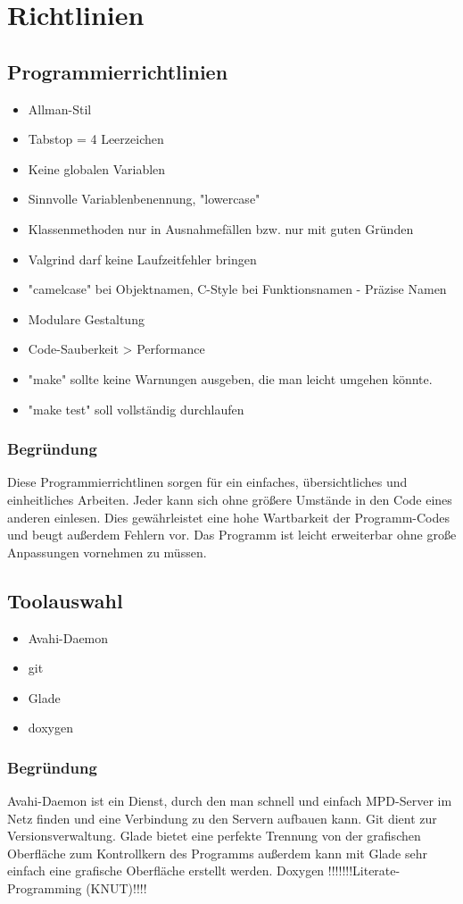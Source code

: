 \chapter{Richtlinien}
\section{Programmierrichtlinien}
\renewcommand{\labelitemi}{•}
\begin{itemize}
	\item Allman-Stil
	\item Tabstop = 4 Leerzeichen
	\item Keine globalen Variablen
	\item Sinnvolle Variablenbenennung, "lowercase"
	\item Klassenmethoden nur in Ausnahmefällen bzw. nur mit guten Gründen
	\item Valgrind darf keine Laufzeitfehler bringen
	\item "camelcase" bei Objektnamen, C-Style bei Funktionsnamen - Präzise Namen
	\item Modulare Gestaltung
	\item Code-Sauberkeit > Performance
	\item "make" sollte keine Warnungen ausgeben, die man leicht umgehen könnte.
	\item "make test" soll vollständig durchlaufen
\end{itemize}
\subsection{Begründung}
Diese Programmierrichtlinen sorgen für ein einfaches, übersichtliches und einheitliches Arbeiten.
Jeder kann sich ohne größere Umstände in den Code eines anderen einlesen. Dies gewährleistet eine 
hohe Wartbarkeit der Programm-Codes und beugt außerdem Fehlern vor. Das Programm ist leicht 
erweiterbar ohne große Anpassungen vornehmen zu müssen.
\section{Toolauswahl}
\begin{itemize}
	\item Avahi-Daemon
	\item git 
	\item Glade
	\item doxygen
\end{itemize}
\subsection{Begründung}
Avahi-Daemon ist ein Dienst, durch den man schnell und einfach MPD-Server im Netz finden und eine 
Verbindung zu den Servern aufbauen kann. Git dient zur Versionsverwaltung. Glade bietet eine perfekte
Trennung von der grafischen Oberfläche zum Kontrollkern des Programms außerdem kann mit Glade sehr 
einfach eine grafische Oberfläche erstellt werden. Doxygen !!!!!!!Literate-Programming (KNUT)!!!!
